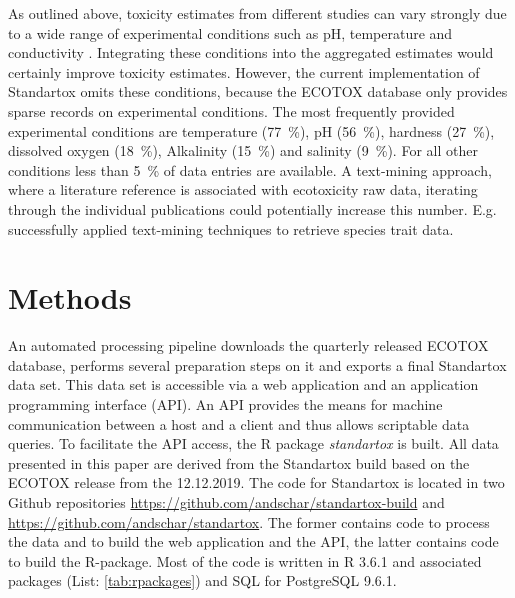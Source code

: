 \documentclass[journal,datadescriptor,submit,moreauthors,pdftex]{Definitions/mdpi}
\begin{document}
\par
As outlined above, toxicity estimates from different studies can vary strongly due to a wide range of experimental conditions such as pH, temperature and conductivity \citep{rosenkrantz_influence_2013, li_temperature_2011}. Integrating these conditions into the aggregated estimates would certainly improve toxicity estimates. However, the current implementation of Standartox omits these conditions, because the ECOTOX database only provides sparse records on experimental conditions. The most frequently provided experimental conditions are temperature (77~\%), pH (56~\%), hardness (27~\%), dissolved oxygen (18~\%), Alkalinity (15~\%) and salinity (9~\%). For all other conditions less than 5~\% of data entries are available. A text-mining approach, where a literature reference is associated with ecotoxicity raw data, iterating through the individual publications could potentially increase this number. E.g. \citet{compson_linking_2018} successfully applied text-mining techniques to retrieve species trait data. 

\section{Methods}
An automated processing pipeline downloads the quarterly released ECOTOX database, performs several preparation steps on it and exports a final Standartox data set. This data set is accessible via a web application and an application programming interface (API). An API provides the means for machine communication between a host and a client and thus allows scriptable data queries. To facilitate the API access, the R \citep{rcoreteam_language_2017} package \textit{standartox} is built. All data presented in this paper are derived from the Standartox build based on the ECOTOX release from the 12.12.2019. The code for Standartox is located in two Github repositories \url{https://github.com/andschar/standartox-build} and \url{https://github.com/andschar/standartox}. The former contains code to process the data and to build the web application and the API, the latter contains code to build the R-package. Most of the code is written in R 3.6.1 and associated packages (List: \ref{tab:rpackages}) and SQL for PostgreSQL 9.6.1.
\end{document}
